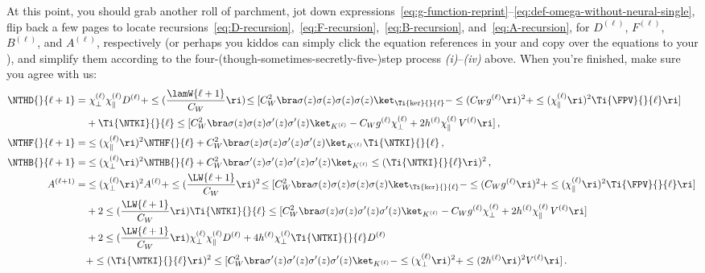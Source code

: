 At this point, you should grab another roll of parchment,
jot down expressions~\eqref{eq:g-function-reprint}--\eqref{eq:def-omega-without-neural-single},
flip back a few pages to locate recursions~\eqref{eq:D-recursion},~\eqref{eq:F-recursion},~\eqref{eq:B-recursion}, and~\eqref{eq:A-recursion},  for $D^{(\ell)}$, $F^{(\ell)}$, $B^{(\ell)}$, and $A^{(\ell)}$, respectively  (or perhaps you kiddos can simply click the equation references in your  and copy over the equations to your ), and simplify them %
according to the four-(though-sometimes-secretly-five-)step process \emph{(i)}--\emph{(iv)} above. When you're finished, make sure you agree with us:
\begin{align}
\label{eq:D-recursion-single}
\NTHD{}{\ell+1}=&\ \chi_{\perp}^{(\ell)}\chi_{\parallel}^{(\ell)} D^{(\ell)}+\le( \frac{\lamW{\ell+1}}{C_W}\ri)\!  \le[C_W^2\bra \sigma(z)\sigma(z)\sigma(z)\sigma(z) \ket_{\Ti{\ker}{}{\ell}}- \le(C_W g^{(\ell)}\ri)^2+\le(\chi_{\parallel}^{(\ell)}\ri)^2\Ti{\FPV}{}{\ell}\ri]\,  \notag \\
&+\Ti{\NTKI}{}{\ell}\le[C_W^2\bra \sigma(z)\sigma(z) \sigma'(z)\sigma'(z)\ket_{K^{(\ell)}}-C_W g^{(\ell)}\chi_{\perp}^{(\ell)}+2h^{(\ell)}\chi_{\parallel}^{(\ell)} \, V^{(\ell)} \ri]    \, , \\
\NTHF{}{\ell+1}=&\le(\chi_{\parallel}^{(\ell)}\ri)^2\NTHF{}{\ell}+C_W^2\bra\sigma(z)\sigma(z) \sigma'(z)\sigma'(z)\ket_{K^{(\ell)}}\Ti{\NTKI}{}{\ell}\, ,\label{eq:F-recursion-single} \\
\NTHB{}{\ell+1}=&\le(\chi_{\perp}^{(\ell)}\ri)^2 \NTHB{}{\ell}  + C_W^2 \bra  \sigma'(z)\sigma'(z)\sigma'(z)\sigma'(z)\ket_{K^{(\ell)}}\le(\Ti{\NTKI}{}{\ell}\ri)^2  \, ,\label{eq:B-recursion-single} \\
A^{(\ell+1)}=& \le(\chi_{\perp}^{(\ell)}\ri)^2 A^{(\ell)}  + \le(\frac{\LW{\ell+1}}{C_W}\ri)^2 \!\le[C_W^2\bra \sigma(z)\sigma(z)\sigma(z)\sigma(z) \ket_{\Ti{\ker}{}{\ell}}- \le(C_W g^{(\ell)}\ri)^2+\le(\chi_{\parallel}^{(\ell)}\ri)^2\Ti{\FPV}{}{\ell}\ri]
\, \nonumber\\
&+2\le(\frac{\LW{\ell+1}}{C_W}\ri)\Ti{\NTKI}{}{\ell}\le[C_W^2\bra \sigma(z)\sigma(z) \sigma'(z)\sigma'(z)\ket_{K^{(\ell)}}-C_W g^{(\ell)}\chi_{\perp}^{(\ell)}+2h^{(\ell)}\chi_{\parallel}^{(\ell)} \, V^{(\ell)} \ri]\, \nonumber\\
&+2\le(\frac{\LW{\ell+1}}{C_W}\ri)\chi_{\perp}^{(\ell)}\chi_{\parallel}^{(\ell)}D^{(\ell)}+4h^{(\ell)}\chi_{\perp}^{(\ell)}\Ti{\NTKI}{}{\ell}D^{(\ell)}\, \nonumber\\
&+\le(\Ti{\NTKI}{}{\ell}\ri)^2 \le[C_W^2\bra \sigma'(z)\sigma'(z)\sigma'(z)\sigma'(z) \ket_{K^{(\ell)}}-\le(\chi_{\perp}^{(\ell)}\ri)^2+\le(2h^{(\ell)}\ri)^2V^{(\ell)}\ri]\, .\label{eq:A-recursion-single}
\end{align}
